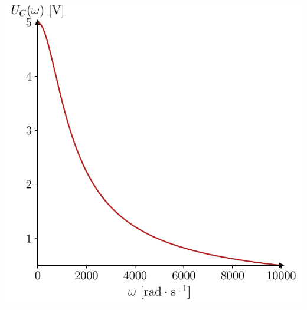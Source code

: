 \documentclass[../../main/main.tex]{subfiles}
\begin{document}
\begin{tcb*}[sidebyside, righthand ratio=.6]
\begin{minipage}[t]{.48\linewidth}
\begin{center}
{				\includegraphics[width=\linewidth]{Ucw_ampl_prof}
			}%
		\end{center}
	\end{minipage}
	\hfill
	\begin{minipage}[t]{.48\linewidth}
		\vspace{0pt}
		\begin{center}
\end{center}
\end{minipage}
\end{tcb*}
\end{document}
